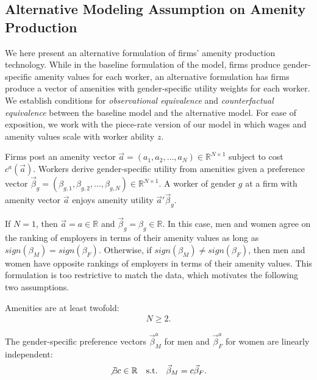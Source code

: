 \subsection{Alternative Modeling Assumption on Amenity Production\label{app:alternative_amenities}}

We here present an alternative formulation of firms' amenity production technology. While in the baseline formulation of the model, firms produce gender-specific amenity values for each worker, an alternative formulation has firms produce a vector of amenities with gender-specific utility weights for each worker. We establish conditions for \emph{observational equivalence} and \emph{counterfactual equivalence} between the baseline model and the alternative model. For ease of exposition, we work with the piece-rate version of our model in which wages and amenity values scale with worker ability $z$.

Firms post an amenity vector $\vec{a}=\left(a_{1},a_{2},\ldots,a_{N}\right)\in\mathbb{R}^{N\times1}$ subject to cost $c^{a}\left(\vec{a}\right)$. Workers derive gender-specific utility from amenities given a preference vector $\vec{\beta}_{g}=\left(\beta_{g,1},\beta_{g,2},\ldots,\beta_{g,N}\right)\in\mathbb{R}^{N\times1}$. A worker of gender $g$ at a firm with amenity vector $\vec{a}$ enjoys amenity utility $\vec{a}'\vec{\beta}_{g}$.

If $N=1$, then $\vec{a}=a\in\mathbb{R}$ and $\vec{\beta}_{g}=\beta_{g}\in\mathbb{R}$. In this case, men and women agree on the ranking of employers in terms of their amenity values as long as $sign(\beta_{M})=sign(\beta_{F})$. Otherwise, if $sign(\beta_{M})\neq sign(\beta_{F})$, then men and women have opposite rankings of employers in terms of their amenity values. This formulation is too restrictive to match the data, which motivates the following two assumptions.

\begin{assumption}\label{ass1-number-amenities}
    Amenities are at least twofold:
    \begin{align}
        N\ge2.
    \end{align}
\end{assumption}

\begin{assumption}\label{ass2-vector-weights}
    The gender-specific preference vectors $\vec{\beta}_{M}^{a}$ for men and $\vec{\beta}_{F}^{a}$ for women are linearly independent:
    \begin{align}
        \not\exists c\in\mathbb{R}\quad\text{s.t.}\quad\vec{\beta}_{M}=c\vec{\beta}_{F}.
    \end{align}
\end{assumption}


